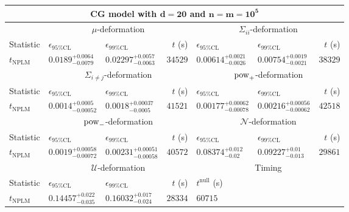 \begin{tabular}{l|llr|llr}
	\toprule
	\multicolumn{7}{c}{{\bf CG model with $\mathbf{d=20}$ and $\mathbf{n=m=10^{5}}$}} \\
	\toprule
	\multicolumn{1}{c}{} & \multicolumn{3}{c}{$\mu$-deformation} & \multicolumn{3}{c}{$\Sigma_{ii}$-deformation} \\
	Statistic & $\epsilon_{95\%\mathrm{CL}}$ & $\epsilon_{99\%\mathrm{CL}}$ & $t$ (s) & $\epsilon_{95\%\mathrm{CL}}$ & $\epsilon_{99\%\mathrm{CL}}$ & $t$ (s) \\
	\midrule
	$t_{\mathrm{NPLM}}$ & $0.0189_{-0.0079}^{+0.0064}$ & $0.02297_{-0.0063}^{+0.0057}$ & $34529$ & $0.00614_{-0.0026}^{+0.0021}$ & $0.00754_{-0.0021}^{+0.0019}$ & $38329$ \\
	\toprule
	\multicolumn{1}{c}{} & \multicolumn{3}{c}{$\Sigma_{i\neq j}$-deformation} & \multicolumn{3}{c}{$\rm{pow}_{+}$-deformation} \\
	Statistic & $\epsilon_{95\%\mathrm{CL}}$ & $\epsilon_{99\%\mathrm{CL}}$ & $t$ (s) & $\epsilon_{95\%\mathrm{CL}}$ & $\epsilon_{99\%\mathrm{CL}}$ & $t$ (s) \\
	\midrule
	$t_{\mathrm{NPLM}}$ & $0.0014_{-0.00052}^{+0.0005}$ & $0.0018_{-0.0005}^{+0.00037}$ & $41521$ & $0.00177_{-0.00078}^{+0.00062}$ & $0.00216_{-0.00062}^{+0.00056}$ & $42518$ \\
	\toprule
	\multicolumn{1}{c}{} & \multicolumn{3}{c}{$\rm{pow}_{-}$-deformation} & \multicolumn{3}{c}{$\mathcal{N}$-deformation} \\
	Statistic & $\epsilon_{95\%\mathrm{CL}}$ & $\epsilon_{99\%\mathrm{CL}}$ & $t$ (s) & $\epsilon_{95\%\mathrm{CL}}$ & $\epsilon_{99\%\mathrm{CL}}$ & $t$ (s) \\
	\midrule
	$t_{\mathrm{NPLM}}$ & $0.0019_{-0.00072}^{+0.00058}$ & $0.00231_{-0.00058}^{+0.00051}$ & $40572$ & $0.08374_{-0.02}^{+0.012}$ & $0.09227_{-0.013}^{+0.01}$ & $29861$ \\
	\toprule
	\multicolumn{1}{c}{} & \multicolumn{3}{c}{$\mathcal{U}$-deformation} & \multicolumn{3}{c}{Timing} \\
	Statistic & $\epsilon_{95\%\mathrm{CL}}$ & $\epsilon_{99\%\mathrm{CL}}$ & $t$ (s) & $t^{\mathrm{null}}$ (s) \\
	\midrule
	$t_{\mathrm{NPLM}}$ & $0.14457_{-0.035}^{+0.022}$ & $0.16032_{-0.024}^{+0.017}$ & $28334$ & $60715$ \\
	\bottomrule
\end{tabular}